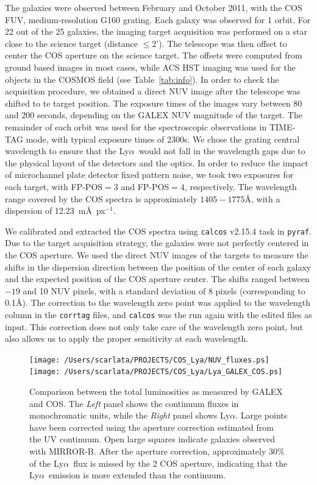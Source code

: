\documentclass[manuscript]{emulateapj}
\newcommand{\lya}{Ly$\alpha$}
\begin{document}
The galaxies were observed between February and October 2011, with the
COS FUV, medium-resolution G160 grating. Each galaxy was observed for
1 orbit. For 22 out of the 25 galaxies, the imaging target acquisition
was performed on a star close to the science target (distance $\le
2$'). The telescope was then offset to center the COS aperture on the
science target. The offsets were computed from ground based images in
most cases, while ACS HST imaging was used for the objects in the
COSMOS field (see Table~\ref{tab:info}). In order to check the
acquisition procedure, we obtained a direct NUV image after the
telescope was shifted to te target position.  The exposure times of
the images vary between 80 and 200 seconds, depending on the GALEX NUV
magnitude of the target. The remainder of each orbit was used for the
spectroscopic observations in TIME-TAG mode, with typical exposure
times of 2300s.  We chose the grating central wavelength to ensure
that the \lya\ would not fall in the wavelength gaps due to the
physical layout of the detectors and the optics. In order to reduce
the impact of microchannel plate detector fixed pattern noise, we took
two exposures for each target, with FP-POS$=3$ and FP-POS$=4$,
respectively. The wavelength range covered by the COS spectra is
approximately $1405-1775$\AA, with a dispersion of 12.23~m\AA\
px$^{-1}$.
                        
We calibrated and extracted the COS spectra using {\tt calcos}
v2.15.4 task in {\tt pyraf}. Due to the target acquisition strategy, the
galaxies were not perfectly centered in the COS aperture. We used the
direct NUV images of the targets to measure the shifts in the dispersion direction
between the position of the center of each galaxy and the expected
position of the COS aperture center. The shifts ranged between $-19$
and 10 NUV pixels, with a standard deviation of 8 pixels
(corresponding to 0.1\AA). The correction to the wavelength zero
point was applied to the wavelength column in the {\tt corrtag} files,
and {\tt calcos} was the run again with the edited files as
input. This correction does not only take care of the wavelength zero
point, but also allows us to apply the proper sensitivity at each
wavelength.

\begin{figure}[t!]
  \centering
  \texttt{[image: /Users/scarlata/PROJECTS/COS\_Lya/NUV\_fluxes.ps]}
  \texttt{[image: /Users/scarlata/PROJECTS/COS\_Lya/Lya\_GALEX\_COS.ps]}
  \caption{Comparison between the total luminosities as measured by GALEX 
	and COS. The \emph{Left} panel shows the continuum fluxes in monochromatic
	units, while the \emph{Right} panel shows \lya. Large
    points have been corrected using the aperture correction estimated
    from the UV continuum. Open large squares indicate galaxies
    observed with MIRROR-B. After the aperture correction,
    approximately 30\% of the \lya\ flux is missed by the 2 COS
    aperture, indicating that the \lya\ emission is more extended than
    the continuum.}
  \label{fig:GALEX_COSflux}
\end{figure}
\end{document}
